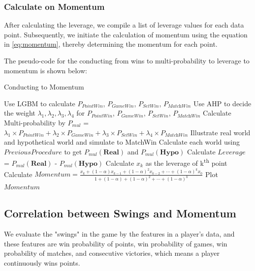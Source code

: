 \documentclass{mcmthesis}
\begin{document}
\subsubsection{Calculate on Momentum}
After calculating the leverage, we compile a list of leverage values for each data point. Subsequently, we initiate the calculation of momentum using the equation in \ref{eq:momentum}, thereby determining the momentum for each point.

The pseudo-code for the conducting from wins to multi-probability to leverage to momentum is shown below:
\begin{algorithm}
\caption{Conducting to Momentum}
    \begin{algorithmic}[1]
        \State Use LGBM to calculate $P_\textit{PointWin}$, $P_\textit{GameWin}$, $P_\textit{SetWin}$, $P_\textit{MatchWin}$
        \State Use AHP to decide the weight $\lambda_1, \lambda_2, \lambda_3, \lambda_4$ for $P_\textit{PointWin}$, $P_\textit{GameWin}$, $P_\textit{SetWin}$, $P_\textit{MatchWin}$
        \State Calculate Multi-probability by $P_\textit{mul}$ = $\lambda_1 \times P_\textit{PointWin} + \lambda_2 \times P_\textit{GameWin} + \lambda_3 \times P_\textit{SetWin} + \lambda_4 \times P_\textit{MatchWin}$
        \EndProcedure
        \State Illustrate real world and hypothetical world and simulate to MatchWin
        \State Calculate each world using $Previous Procedure$ to get $P_\textit{mul}( \textbf{Real})$ and $P_\textit{mul}( \textbf{Hypo})$
        \State Calculate $Leverage$ = $P_\textit{mul}( \textbf{Real})$ - $P_\textit{mul}( \textbf{Hypo})$
        \EndProcedure
        \State Calculate $x_k$ as the leverage of k\textsuperscript{th} point
        \State Calculate $Momentum = \frac{x_k + (1 - \alpha)x_{k-1} + (1 - \alpha)^2 x_{k-2} + \cdots + (1 - \alpha)^k x_0}{1 + (1 - \alpha) + (1 - \alpha)^2 + \cdots + (1 - \alpha)^k}$
        \EndProcedure
        \State Plot $Momentum$
    \end{algorithmic}
\end{algorithm}

\subsection{Correlation between Swings and Momentum}
We evaluate the "swings" in the game by the features in a player's data, and these features are win probability of points, win probability of games, win probability of matches, and consecutive victories, which means a player continuously wins points. 
\end{document}

